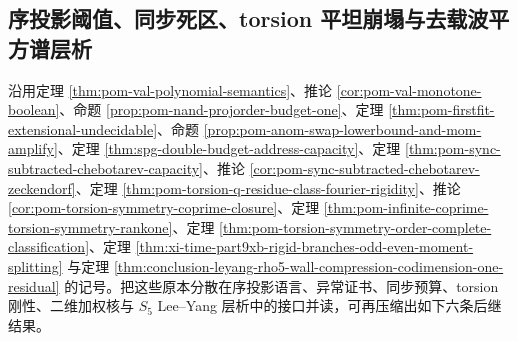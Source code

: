 \subsection{序投影阈值、同步死区、torsion 平坦崩塌与去载波平方谱层析}\label{subsec:conclusion-order-sync-torsion-prony-s5-defectline}
沿用定理 \ref{thm:pom-val-polynomial-semantics}、推论 \ref{cor:pom-val-monotone-boolean}、命题 \ref{prop:pom-nand-projorder-budget-one}、定理 \ref{thm:pom-firstfit-extensional-undecidable}、命题 \ref{prop:pom-anom-swap-lowerbound-and-mom-amplify}、定理 \ref{thm:spg-double-budget-address-capacity}、定理 \ref{thm:pom-sync-subtracted-chebotarev-capacity}、推论 \ref{cor:pom-sync-subtracted-chebotarev-zeckendorf}、定理 \ref{thm:pom-torsion-q-residue-class-fourier-rigidity}、推论 \ref{cor:pom-torsion-symmetry-coprime-closure}、定理 \ref{thm:pom-infinite-coprime-torsion-symmetry-rankone}、定理 \ref{thm:pom-torsion-symmetry-order-complete-classification}、定理 \ref{thm:xi-time-part9xb-rigid-branches-odd-even-moment-splitting} 与定理 \ref{thm:conclusion-leyang-rho5-wall-compression-codimension-one-residual} 的记号。把这些原本分散在序投影语言、异常证书、同步预算、torsion 刚性、二维加权核与 \(S_5\) Lee--Yang 层析中的接口并读，可再压缩出如下六条后继结果。

